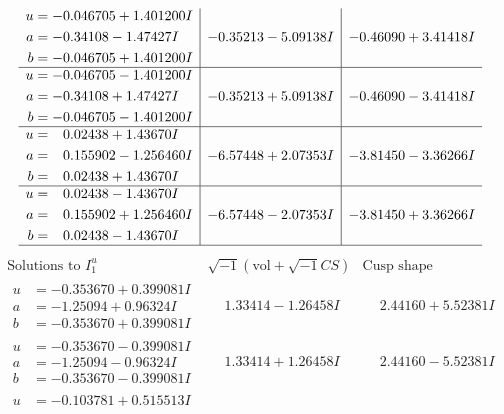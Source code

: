 \documentclass[1p]{elsarticle_modified}
\theoremstyle{definition}
\newcommand{\I}{\sqrt{-1}}
\begin{document}
$$\begin{array}{c|c|c}
\begin{aligned}
u &= -0.046705 + 1.401200 I \\
a &= -0.34108 - 1.47427 I \\
b &= -0.046705 + 1.401200 I\end{aligned}
 & -0.35213 - 5.09138 I & -0.46090 + 3.41418 I \\ \hline\begin{aligned}
u &= -0.046705 - 1.401200 I \\
a &= -0.34108 + 1.47427 I \\
b &= -0.046705 - 1.401200 I\end{aligned}
 & -0.35213 + 5.09138 I & -0.46090 - 3.41418 I \\ \hline\begin{aligned}
u &= \phantom{-}0.02438 + 1.43670 I \\
a &= \phantom{-}0.155902 - 1.256460 I \\
b &= \phantom{-}0.02438 + 1.43670 I\end{aligned}
 & -6.57448 + 2.07353 I & -3.81450 - 3.36266 I \\ \hline\begin{aligned}
u &= \phantom{-}0.02438 - 1.43670 I \\
a &= \phantom{-}0.155902 + 1.256460 I \\
b &= \phantom{-}0.02438 - 1.43670 I\end{aligned}
 & -6.57448 - 2.07353 I & -3.81450 + 3.36266 I\\
 \hline 
 \end{array}$$\newpage$$\begin{array}{c|c|c}  
\text{Solutions to }I^u_{1}& \I (\text{vol} + \sqrt{-1}CS) & \text{Cusp shape}\\
 \hline 
\begin{aligned}
u &= -0.353670 + 0.399081 I \\
a &= -1.25094 + 0.96324 I \\
b &= -0.353670 + 0.399081 I\end{aligned}
 & \phantom{-}1.33414 - 1.26458 I & \phantom{-}2.44160 + 5.52381 I \\ \hline\begin{aligned}
u &= -0.353670 - 0.399081 I \\
a &= -1.25094 - 0.96324 I \\
b &= -0.353670 - 0.399081 I\end{aligned}
 & \phantom{-}1.33414 + 1.26458 I & \phantom{-}2.44160 - 5.52381 I \\ \hline\begin{aligned}
u &= -0.103781 + 0.515513 I \\

\end{aligned}
\end{array}$$
\end{document}

